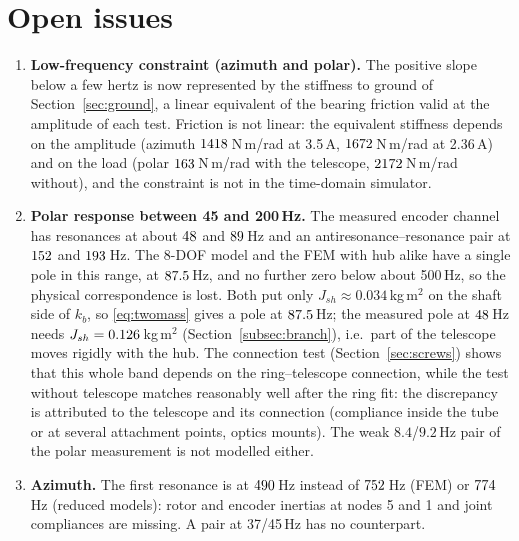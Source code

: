 \documentclass[10pt,a4paper]{article}
\numberwithin{equation}{section}
\begin{document}
\section{Open issues}\label{sec:open}
\begin{enumerate}
\item \textbf{Low-frequency constraint (azimuth and polar).} The positive slope below a few hertz is now represented by the stiffness to ground of Section~\ref{sec:ground}, a linear equivalent of the bearing friction valid at the amplitude of each test. Friction is not linear: the equivalent stiffness depends on the amplitude (azimuth $1418$\,N\,m/rad at 3.5\,A, $1672$\,N\,m/rad at 2.36\,A) and on the load (polar $163$\,N\,m/rad with the telescope, $2172$\,N\,m/rad without), and the constraint is not in the time-domain simulator.
\item \textbf{Polar response between 45 and 200\,Hz.} The measured encoder channel has resonances at about $48$ and $89$\,Hz and an antiresonance--resonance pair at $152$ and $193$\,Hz. The 8-DOF model and the FEM with hub alike have a single pole in this range, at $87.5$\,Hz, and no further zero below about 500\,Hz, so the physical correspondence is lost. Both put only $J_{sh} \approx 0.034$\,kg\,m$^2$ on the shaft side of $k_b$, so \eqref{eq:twomass} gives a pole at $87.5$\,Hz; the measured pole at $48$\,Hz needs $J_{sh} = 0.126$\,kg\,m$^2$ (Section~\ref{subsec:branch}), i.e.\ part of the telescope moves rigidly with the hub. The connection test (Section~\ref{sec:screws}) shows that this whole band depends on the ring--telescope connection, while the test without telescope matches reasonably well after the ring fit: the discrepancy is attributed to the telescope and its connection (compliance inside the tube or at several attachment points, optics mounts). The weak $8.4$/$9.2$\,Hz pair of the polar measurement is not modelled either.
\item \textbf{Azimuth.} The first resonance is at $490$\,Hz instead of $752$\,Hz (FEM) or $774$\,Hz (reduced models): rotor and encoder inertias at nodes 5 and 1 and joint compliances are missing. A pair at 37/45\,Hz has no counterpart.
\end{enumerate}

\end{document}
